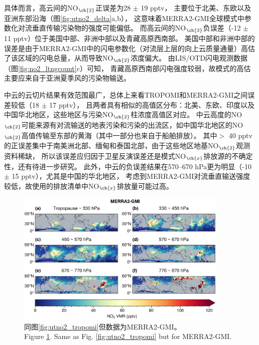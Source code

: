 具体而言，高云间的NO$_{\ch{2}}$正误差为28 $\pm$ 19 pptv，
主要位于北美、东欧以及亚洲东部沿海（图\ref{fig:utno2_delta}a,b），
这意味着MERRA2-GMI全球模式中参数化对流垂直传输污染物的强度可能偏低。
而高云间的NO$_{\ch{2}}$负误差（-12 $\pm$ 11 pptv）位于美国中部、非洲中部以及青藏高原西南部。
美国中部和非洲中部的误差是由于MERRA2-GMI中的闪电参数化（对流层上层的向上云质量通量）高估了该区域的闪电总量，从而导致NO$_{\ch{2}}$浓度偏大\citep{Allen.2002,Allen.2010}。
由LIS/OTD闪电观测数据（图\ref{fig:no2_ltngcount}c）可知，
青藏高原西南部闪电强度较弱，故模式的高估主要应来自于亚洲夏季风的污染物输送。

中云的云切片结果有效范围最广，总体上来看TROPOMI和MERRA2-GMI之间误差较低（18 $\pm$ 17 pptv），
且两者具有相似的高值区分布：北美、东欧、印度以及中国华北地区，这些地区与污染NO$_{\ch{2}}$柱浓度高值区对应。
中云高度的NO$_{\ch{2}}$可能来源有对流输送的地表污染和污染的出流区，如中国华北地区的NO$_{\ch{2}}$高值传输至东部的黄海（其中一部分也来自于船舶排放）。
其中$>$ 40 pptv的正误差集中于南美洲北部、缅甸和泰国北部，由于这些地区地基NO$_{\ch{2}}$观测资料稀缺，
所以该误差应归因于卫星反演误差还是模式NO$_{\ch{x}}$排放源的不确定性，还有待进一步研究。
此外，中云的负误差结果在570--670 hPa更为明显（-10 $\pm$ 15 pptv），尤其是中国的华北地区，
考虑到MERRA2-GMI对流垂直输送强度较低，故使用的排放清单中NO$_{\ch{x}}$排放量可能过高\citep{Ziemke.2019}。

\begin{figure}[H]
    \centering
    \includegraphics[width=0.9\textwidth]{./figures/utno2_merra2-gmi.png}
    \caption{
    同图\ref{fig:utno2_tropomi}但数据为MERRA2-GMI。 \\
    Figure \ref{fig:utno2_merra2}. Same as Fig. \ref{fig:utno2_tropomi} but for MERRA2-GMI.
    }
    \label{fig:utno2_merra2}
\end{figure}

